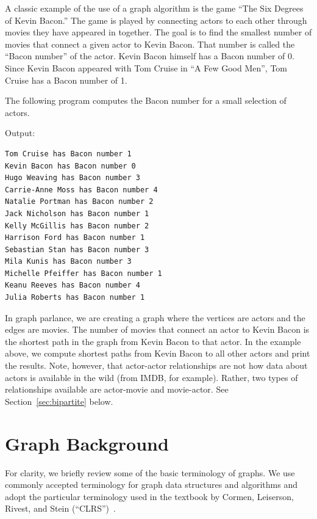 A classic example of the use of a graph algorithm is the game ``The Six Degrees of Kevin Bacon.''
The game is played by connecting actors to each other through movies they have appeared in together.
The goal is to find the smallest number of movies that connect a given actor to Kevin Bacon.
That number is called the ``Bacon number'' of the actor. Kevin Bacon himself has a Bacon number of 0.
Since Kevin Bacon appeared with Tom Cruise in ``A Few Good Men'', Tom Cruise has a Bacon number of 1.

The following program computes the Bacon number for a small selection of actors.

{\small
  
}


\noindent
Output:
\begin{lstlisting}
Tom Cruise has Bacon number 1
Kevin Bacon has Bacon number 0
Hugo Weaving has Bacon number 3
Carrie-Anne Moss has Bacon number 4
Natalie Portman has Bacon number 2
Jack Nicholson has Bacon number 1
Kelly McGillis has Bacon number 2
Harrison Ford has Bacon number 1
Sebastian Stan has Bacon number 3
Mila Kunis has Bacon number 3
Michelle Pfeiffer has Bacon number 1
Keanu Reeves has Bacon number 4
Julia Roberts has Bacon number 1    
\end{lstlisting}  


In graph parlance, we are creating a graph where the vertices are actors and the edges are movies.
The number of movies that connect an actor to Kevin Bacon is the shortest path in the graph
from Kevin Bacon to that actor. In the example above, we compute shortest paths from Kevin
Bacon to all other actors and print the results.
Note, however, that actor-actor relationships are not how data about actors
is available in the wild (from IMDB, for example).  Rather, two types of  relationships available are actor-movie and movie-actor.  See Section~\ref{sec:bipartite} below.


\section{Graph Background} %

For clarity, we briefly review some of the basic terminology of graphs.
We use commonly accepted terminology for graph data structures and algorithms and
adopt the particular terminology used in the textbook by
Cormen, Leiserson, Rivest, and Stein (``CLRS'')~\cite{CLRS2022}.

